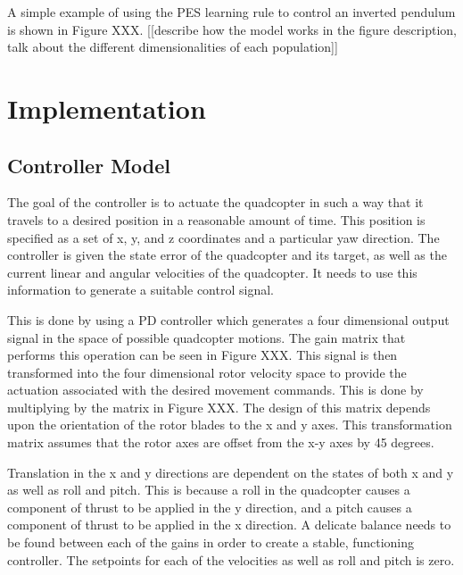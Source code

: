 \documentclass[letterpaper,12pt,titlepage,oneside,final]{book}
\begin{document}
A simple example of using the PES learning rule to control an inverted pendulum is shown in Figure XXX. [[describe how the model works in the figure description, talk about the different dimensionalities of each population]]


\chapter{Implementation}

\section{Controller Model}


The goal of the controller is to actuate the quadcopter in such a way that it travels to a desired position in a reasonable amount of time. 
This position is specified as a set of x, y, and z coordinates and a particular yaw direction. 
The controller is given the state error of the quadcopter and its target, as well as the current linear and angular velocities of the quadcopter. 
It needs to use this information to generate a suitable control signal.

This is done by using a PD controller which generates a four dimensional output signal in the space of possible quadcopter motions. 
The gain matrix that performs this operation can be seen in Figure XXX. 
This signal is then transformed into the four dimensional rotor velocity space to provide the actuation associated with the desired movement commands. 
This is done by multiplying by the matrix in Figure XXX. 
The design of this matrix depends upon the orientation of the rotor blades to the x and y axes. 
This transformation matrix assumes that the rotor axes are offset from the x-y axes by 45 degrees.

Translation in the x and y directions are dependent on the states of both x and y as well as roll and pitch. 
This is because a roll in the quadcopter causes a component of thrust to be applied in the y direction, and a pitch causes a component of thrust to be applied in the x direction.
A delicate balance needs to be found between each of the gains in order to create a stable, functioning controller. 
The setpoints for each of the velocities as well as roll and pitch is zero.
\end{document}
